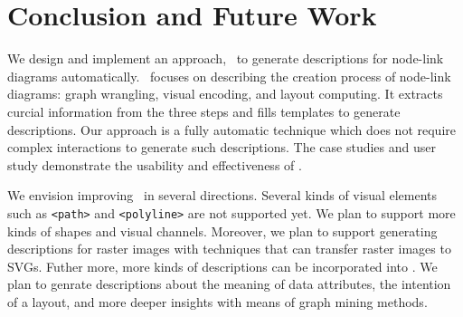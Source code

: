 \section{Conclusion and Future Work}
We design and implement an approach, \ApproachName~to generate descriptions for node-link diagrams automatically.
\ApproachName~focuses on describing the creation process of node-link diagrams: graph wrangling, visual encoding, and layout computing.
It extracts curcial information from the three steps and fills templates to generate descriptions.
Our approach is a fully automatic technique which does not require complex interactions to generate such descriptions.
The case studies and user study demonstrate the usability and effectiveness of \ApproachName.

We envision improving \ApproachName~in several directions.
Several kinds of visual elements such as \texttt{<path>} and \texttt{<polyline>} are not supported yet.
We plan to support more kinds of shapes and visual channels.
Moreover, we plan to support generating descriptions for raster images with techniques that can transfer raster images to SVGs.
Futher more, more kinds of descriptions can be incorporated into \ApproachName.
We plan to genrate descriptions about the meaning of data attributes, the intention of a layout, and more deeper insights with means of graph mining methods.